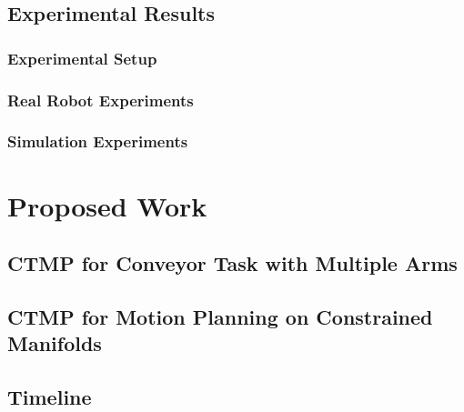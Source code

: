 \documentclass[a4paper,10pt]{article}
\begin{document}
\subsection{Experimental Results}
\subsubsection{Experimental Setup}
\subsubsection{Real Robot Experiments}
\subsubsection{Simulation Experiments}

\section{Proposed Work}
\subsection{CTMP for Conveyor Task with Multiple Arms}
\subsection{CTMP for Motion Planning on Constrained Manifolds}
\subsection{Timeline}




\newpage



\end{document}
